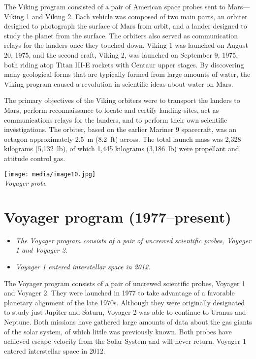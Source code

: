 The Viking program consisted of a pair of American space probes sent to
Mars---Viking 1 and Viking 2. Each vehicle was composed of two main
parts, an orbiter designed to photograph the surface of Mars from orbit,
and a lander designed to study the planet from the surface. The orbiters
also served as communication relays for the landers once they touched
down. Viking 1 was launched on August 20, 1975, and the second craft,
Viking 2, was launched on September 9, 1975, both riding atop Titan
III-E rockets with Centaur upper stages. By discovering many geological
forms that are typically formed from large amounts of water, the Viking
program caused a revolution in scientific ideas about water on Mars.

The primary objectives of the Viking orbiters were to transport the
landers to Mars, perform reconnaissance to locate and certify landing
sites, act as communications relays for the landers, and to perform
their own scientific investigations. The orbiter, based on the earlier
Mariner 9 spacecraft, was an octagon approximately 2.5~m (8.2~ft)
across. The total launch mass was 2,328 kilograms (5,132~lb), of which
1,445 kilograms (3,186~lb) were propellant and attitude control gas.

\texttt{[image: media/image10.jpg]}\\
\emph{Voyager probe}

\section{Voyager program
(1977--present)}\label{voyager-program-1977present}

\begin{itemize}
\item
  \emph{The Voyager program consists of a pair of uncrewed scientific
  probes, Voyager 1 and Voyager 2.}
\item
  \emph{Voyager 1 entered interstellar space in 2012.}
\end{itemize}

The Voyager program consists of a pair of uncrewed scientific probes,
Voyager 1 and Voyager 2. They were launched in 1977 to take advantage of
a favorable planetary alignment of the late 1970s. Although they were
originally designated to study just Jupiter and Saturn, Voyager 2 was
able to continue to Uranus and Neptune. Both missions have gathered
large amounts of data about the gas giants of the solar system, of which
little was previously known. Both probes have achieved escape velocity
from the Solar System and will never return. Voyager 1 entered
interstellar space in 2012.

